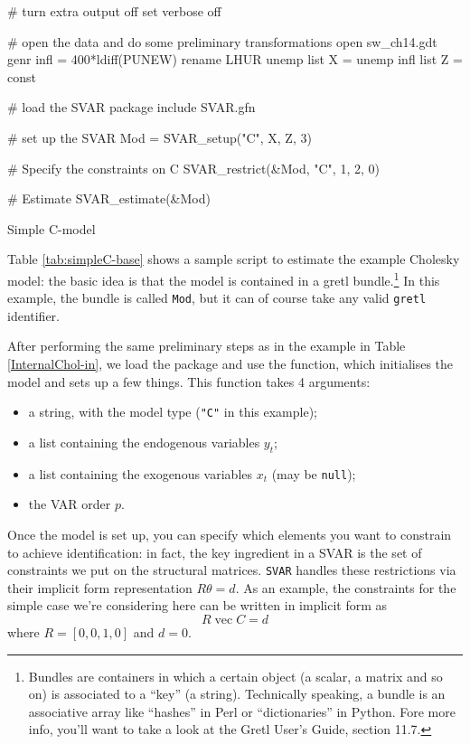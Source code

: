 \documentclass[a4paper,10pt]{article}
\newcommand{\app}[1]{\textsf{#1}}
\newcommand{\dtk}[1]{\texttt{\detokenize{#1}}}
\newcounter{script}[section]
\DeclareMathOperator{\VEC}{\mathrm{vec}}
\begin{document}
\begin{table}[htbp]
\begin{scode}
# turn extra output off
set verbose off

# open the data and do some preliminary transformations
open sw_ch14.gdt
genr infl = 400*ldiff(PUNEW)
rename LHUR unemp
list X = unemp infl
list Z = const

# load the SVAR package
include SVAR.gfn

# set up the SVAR
Mod = SVAR_setup("C", X, Z, 3)

# Specify the constraints on C
SVAR_restrict(&Mod, "C", 1, 2, 0)

# Estimate
SVAR_estimate(&Mod)
  \end{scode}
  \caption{Simple C-model}
  \label{tab:simpleC-base}
\end{table}

Table \ref{tab:simpleC-base} shows a sample script to estimate the
example Cholesky model: the basic idea is that the model is contained
in a \app{gretl} bundle.\footnote{Bundles are containers in which a certain
  object (a scalar, a matrix and so on) is associated to a ``key'' (a
  string). Technically speaking, a bundle is an associative array like ``hashes''
   in Perl or ``dictionaries'' in Python. Fore more info, you'll want to take a
  look at the Gretl User's Guide, section 11.7.} In this example,
the bundle is called \texttt{Mod}, but it can of course take any valid
\texttt{gretl} identifier.

After performing the same preliminary steps as in the example in Table
\ref{InternalChol-in}, we load the package and use the
\dtk{SVAR_setup} function, which initialises the model and sets up
a few things. This function takes 4 arguments:
\begin{itemize}
\item a string, with the model type (\texttt{"C"} in this example);
\item a list containing the endogenous variables $y_t$;
\item a list containing the exogenous variables $x_t$ (may be
  \texttt{null});
\item the VAR order $p$.
\end{itemize}

Once the model is set up, you can specify which elements you want to
constrain to achieve identification: in fact, the key ingredient in a
SVAR is the set of constraints we put on the structural
matrices. \texttt{SVAR} handles these restrictions via their implicit
form representation $R \theta = d$.  As an example, the constraints
for the simple case we're considering here can be written in implicit
form as
\[
  R \VEC C = d
\]
where $R = \left[ 0, 0, 1, 0 \right]$ and $d=0$.
\end{document}
